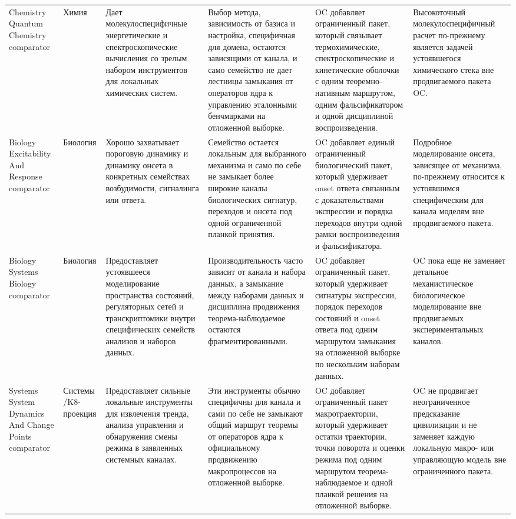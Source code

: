 \begin{longtable}{@{}L{0.17\textwidth}L{0.09\textwidth}L{0.17\textwidth}L{0.17\textwidth}L{0.20\textwidth}L{0.14\textwidth}@{}}
Chemistry Quantum Chemistry comparator & Химия & Дает молекулоспецифичные энергетические и спектроскопические вычисления со зрелым набором инструментов для локальных химических систем. & Выбор метода, зависимость от базиса и настройка, специфичная для домена, остаются зависящими от канала, и само семейство не дает лестницы замыкания от операторов ядра к управлению эталонными бенчмарками на отложенной выборке. & OC добавляет ограниченный пакет, который связывает термохимические, спектроскопические и кинетические оболочки с одним теоремно-нативным маршрутом, одним фальсификатором и одной дисциплиной воспроизведения. & Высокоточный молекулоспецифичный расчет по-прежнему является задачей устоявшегося химического стека вне продвигаемого пакета OC. \\
Biology Excitability And Response comparator & Биология & Хорошо захватывает пороговую динамику и динамику онсета в конкретных семействах возбудимости, сигналинга или ответа. & Семейство остается локальным для выбранного механизма и само по себе не замыкает более широкие каналы биологических сигнатур, переходов и онсета под одной ограниченной планкой принятия. & OC добавляет единый ограниченный биологический пакет, который удерживает onset ответа связанным с доказательствами экспрессии и порядка переходов внутри одной рамки воспроизведения и фальсификатора. & Подробное моделирование онсета, зависящее от механизма, по-прежнему относится к устоявшимся специфическим для канала моделям вне продвигаемого пакета. \\
Biology Systems Biology comparator & Биология & Предоставляет устоявшееся моделирование пространства состояний, регуляторных сетей и транскриптомики внутри специфических семейств анализов и наборов данных. & Производительность часто зависит от канала и набора данных, а замыкание между наборами данных и дисциплина продвижения теорема-наблюдаемое остаются фрагментированными. & OC добавляет ограниченный пакет, который удерживает сигнатуры экспрессии, порядок переходов состояний и onset ответа под одним маршрутом замыкания на отложенной выборке по нескольким наборам данных. & OC пока еще не заменяет детальное механистическое биологическое моделирование вне продвигаемых экспериментальных каналов. \\
Systems System Dynamics And Change Points comparator & Системы /\allowbreak K8-проекция & Предоставляет сильные локальные инструменты для извлечения тренда, анализа управления и обнаружения смены режима в заявленных системных каналах. & Эти инструменты обычно специфичны для канала и сами по себе не замыкают общий маршрут теоремы от операторов ядра к официальному продвижению макропроцессов на отложенной выборке. & OC добавляет ограниченный пакет макротраектории, который удерживает остатки траектории, точки поворота и оценки режима под одним маршрутом теорема-наблюдаемое и одной планкой решения на отложенной выборке. & OC не продвигает неограниченное предсказание цивилизации и не заменяет каждую локальную макро- или управляющую модель вне ограниченного пакета. \\

\end{longtable}
